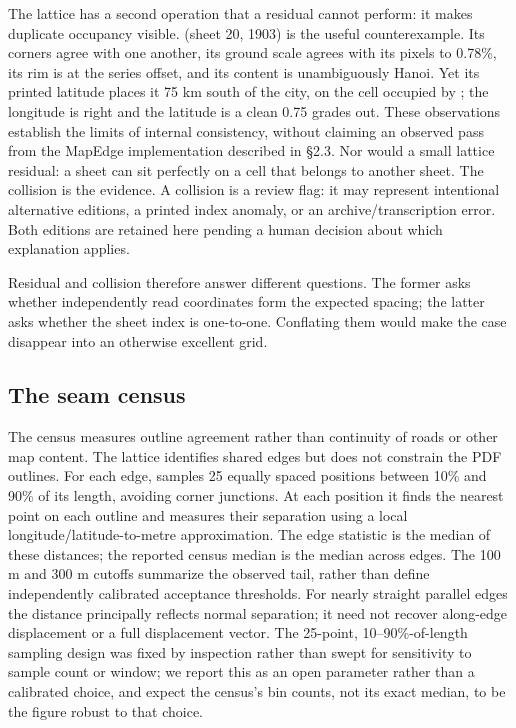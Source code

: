 \documentclass[11pt,a4paper]{article}
\begin{document}
The lattice has a second operation that a residual cannot perform: it makes duplicate occupancy visible. \texttt{} (sheet 20, 1903) is the useful counterexample. Its corners agree with one another, its ground scale agrees with its pixels to 0.78\%, its rim is at the series offset, and its content is unambiguously Hanoi. Yet its printed latitude places it 75 km south of the city, on the cell occupied by \texttt{}; the longitude is right and the latitude is a clean 0.75 grades out. These observations establish the limits of internal consistency, without claiming an observed pass from the MapEdge implementation described in §2.3. Nor would a small lattice residual: a sheet can sit perfectly on a cell that belongs to another sheet. The collision is the evidence. A collision is a review flag: it may represent intentional alternative editions, a printed index anomaly, or an archive/transcription error. Both editions are retained here pending a human decision about which explanation applies.

Residual and collision therefore answer different questions. The former asks whether independently read coordinates form the expected spacing; the latter asks whether the sheet index is one-to-one. Conflating them would make the \texttt{} case disappear into an otherwise excellent grid.

\subsection{The seam census}

The census measures outline agreement rather than continuity of roads or other map content. The lattice identifies shared edges but does not constrain the PDF outlines. For each edge, \texttt{} samples 25 equally spaced positions between 10\% and 90\% of its length, avoiding corner junctions. At each position it finds the nearest point on each outline and measures their separation using a local longitude/latitude-to-metre approximation. The edge statistic is the median of these distances; the reported census median is the median across edges. The 100 m and 300 m cutoffs summarize the observed tail, rather than define independently calibrated acceptance thresholds. For nearly straight parallel edges the distance principally reflects normal separation; it need not recover along-edge displacement or a full displacement vector. The 25-point, 10–90\%-of-length sampling design was fixed by inspection rather than swept for sensitivity to sample count or window; we report this as an open parameter rather than a calibrated choice, and expect the census's bin counts, not its exact median, to be the figure robust to that choice.
\end{document}
